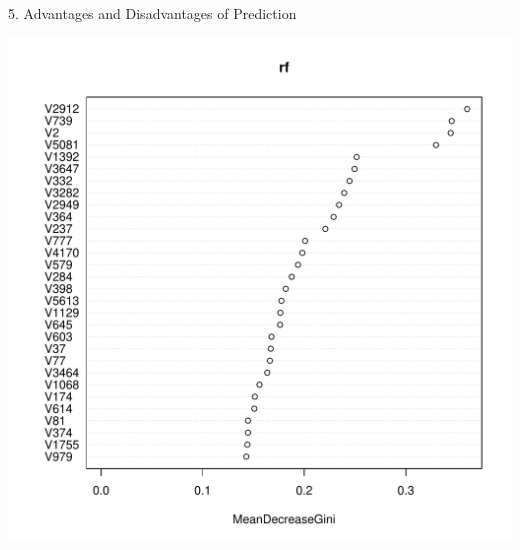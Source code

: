 \begin{frame}[fragile]

\be
\item[5.] Advantages and Disadvantages of Prediction
\ee

\end{frame}
\begin{frame}[fragile]

\centering
\includegraphics[scale=.45]{images/rf_vip_prostate}

\end{frame}












